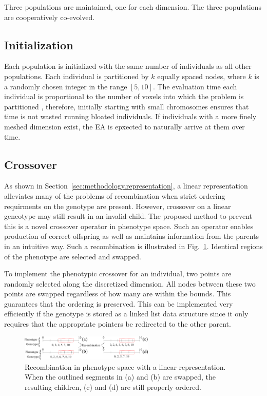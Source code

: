 \documentclass[conference]{IEEEtran}
\begin{document}
Three populations are maintained, one for each dimension. The three populations are cooperatively co-evolved. 

\subsection{Initialization}
Each population is initialized with the same number of individuals as all other populations. Each individual is partitioned by $k$ equally spaced nodes, where $k$ is a randomly chosen integer in the range $[5,10]$. The evaluation time each individual is proportional to the number of voxels into which the problem is partitioned \cite{ref:Mosher2015}, therefore, initially starting with small chromosomes ensures that time is not wasted running bloated individuals. If individuals with a more finely meshed dimension exist, the EA is epxected to naturally arrive at them over time.

\subsection{Crossover}\label{sec:xover}
As shown in Section~\ref{sec:methodology.representation}, a linear representation alleviates many of the problems of recombination when strict ordering requirments on the genotype are present. However, crossover on a linear geneotype may still result in an invalid child. The proposed method to prevent this is a novel crossover operator in phenotype space. Such an operator enables production of correct offspring as well as maintains information from the parents in an intuitive way. Such a recombination is illustrated in Fig.~\ref{fig:linearxover}. Identical regions of the phenotype are selected and swapped.

To implement the phenotypic crossover for an individual, two points are randomly selected along the discretized dimension. All nodes between these two points are swapped regardless of how many are within the bounds. This guarantees that the ordering is preserved. This can be implemented very efficiently if the genotype is stored as a linked list data structure since it only requires that the appropriate pointers be redirected to the other parent.
\begin{figure}[!t]
\centering
\includegraphics[width=2.5in]{linearxover}
\caption{Recombination in phenotype space with a linear representation. When the outlined segments in (a) and (b) are swapped, the resulting children, (c) and (d) are still properly ordered.}
\label{fig:linearxover}
\end{figure}
\end{document}
